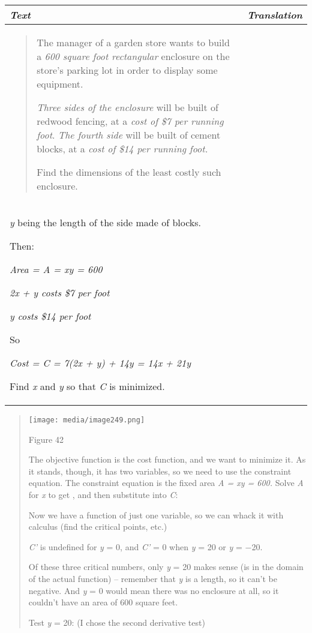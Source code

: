 \begin{longtable}[]{@{}ll@{}}
\toprule
\emph{\textbf{Text}} & \emph{\textbf{Translation}}\tabularnewline
\midrule
\endhead
\begin{minipage}[t]{0.48\columnwidth}\raggedright\strut
\begin{quote}
The manager of a garden store wants to build a \emph{600 square foot
rectangular} enclosure on the store's parking lot in order to display
some equipment.

\emph{Three sides of the enclosure} will be built of redwood fencing, at
a \emph{cost of \$7 per running foot}. \emph{The fourth side} will be
built of cement blocks, at a \emph{cost of \$14 per running foot.}

Find the dimensions of the least costly such enclosure.
\end{quote}\strut
\end{minipage} & \begin{minipage}[t]{0.48\columnwidth}\raggedright\strut
Let \emph{x} and \emph{y} be the dimensions of the enclosure, with\\
\emph{y} being the length of the side made of blocks.

Then:

\emph{Area = A = xy = 600}

\emph{2x + y costs \$7 per foot}

\emph{y costs \$14 per foot}

So

\emph{Cost = C = 7(2x + y) + 14y = 14x + 21y}

Find \emph{x} and \emph{y} so that \emph{C} is minimized.\strut
\end{minipage}\tabularnewline
\bottomrule
\end{longtable}

\begin{quote}
\texttt{[image: media/image249.png]}

Figure 42

The objective function is the cost function, and we want to minimize it.
As it stands, though, it has two variables, so we need to use the
constraint equation. The constraint equation is the fixed area \emph{A =
xy = 600.} Solve \emph{A} for \emph{x} to get , and then substitute into
\emph{C}:

Now we have a function of just one variable, so we can whack it with
calculus (find the critical points, etc.)

\emph{C'} is undefined for \emph{y} = 0, and \emph{C'} = 0 when \emph{y}
= 20 or \emph{y} = −20.

Of these three critical numbers, only \emph{y} = 20 makes sense (is in
the domain of the actual function) -- remember that \emph{y} is a
length, so it can't be negative. And \emph{y} = 0 would mean there was
no enclosure at all, so it couldn't have an area of 600 square feet.

Test \emph{y} = 20: (I chose the second derivative test)
\end{quote}

